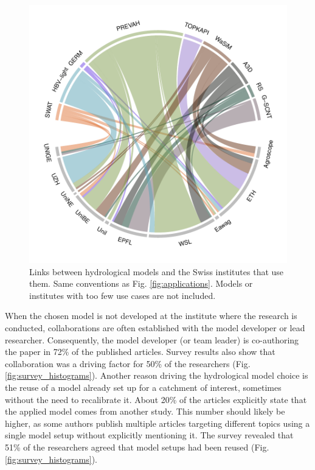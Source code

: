 \documentclass[10pt,a4paper]{article}
\begin{document}
\begin{figure}[htb]
	\begin{center}
		\includegraphics[width=0.70\columnwidth]{figures/chord_diagram_institutes}
		\caption{{Links between hydrological models and the Swiss institutes that use them. Same conventions as Fig. \ref{fig:applications}. Models or institutes with too few use cases are not included.
		{\label{fig:model-institutes}}
		}}
	\end{center}
\end{figure}

When the chosen model is not developed at the institute where the research is conducted, collaborations are often established with the model developer or lead researcher. Consequently, the model developer (or team leader) is co-authoring the paper in 72\% of the published articles. Survey results also show that collaboration was a driving factor for 50\% of the researchers (Fig. \ref{fig:survey_histograms}). Another reason driving the hydrological model choice is the reuse of a model already set up for a catchment of interest, sometimes without the need to recalibrate it. About 20\% of the articles explicitly state that the applied model comes from another study. This number should likely be higher, as some authors publish multiple articles targeting different topics using a single model setup without explicitly mentioning it. The survey revealed that 51\% of the researchers agreed that model setups had been reused (Fig. \ref{fig:survey_histograms}).
\end{document}
